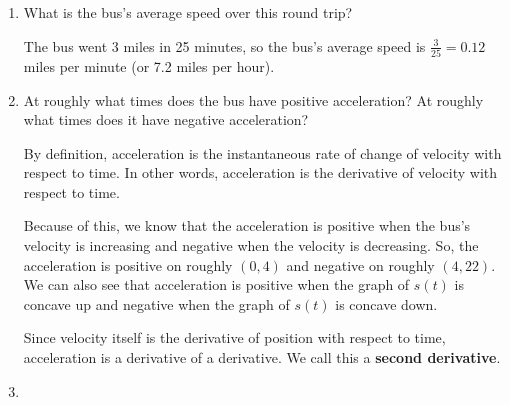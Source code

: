 \documentclass{article}
\begin{document}
\begin{enumerate}
\begin{enumerate}[start=4]
    \begin{solution}
      The bus's average velocity is zero since the change in the bus's position is zero.
    \end{solution}

  \item
    \begin{problem}[0.1in]
      What is the bus's average speed over this round trip?
    \end{problem}

    \begin{solution}
      The bus went 3 miles in 25 minutes, so the bus's average speed is
      $\frac{3}{25} = 0.12$ miles per minute (or 7.2 miles per hour).
    \end{solution}

  \item


    \begin{problem}[0.5in]
      At roughly what times does the bus have positive acceleration? At roughly what times does it have negative acceleration?
    \end{problem}

    \begin{solution}
      By definition, acceleration is the instantaneous rate of change of velocity with respect to time. In other words, acceleration is the derivative of velocity with respect to time. 
      
      Because of this, we know that the acceleration is positive when the bus's velocity is increasing 
      and negative when the velocity is decreasing. So, the acceleration is positive on roughly $(0, 4)$ 
      and negative on roughly $(4, 22)$. We can also see that acceleration is positive when the graph of $s(t)$ 
      is concave up and negative when the graph of $s(t)$ is concave down. 

      Since velocity itself is the derivative of position
      with respect to time, acceleration is a derivative of a derivative. We call this a \textbf{second derivative}.
    \end{solution}

    \pspace{\newpage}

  \item



\end{enumerate}
\end{enumerate}
\end{document}
